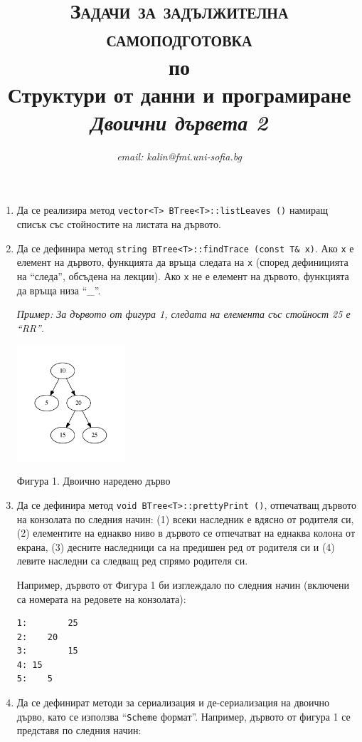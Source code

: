 \documentclass[12pt,a4paper]{article}
\author{\textit{email: kalin@fmi.uni-sofia.bg}}
\title{\textsc{Задачи за задължителна самоподготовка} \\
по \\
Структури от данни и програмиране\\
\textit{Двоични дървета 2}}
\begin{document}
\maketitle


\begin{enumerate}

	\item Да се реализира метод \texttt{vector<T> BTree<T>::listLeaves ()} намиращ списък със стойностите на листата на дървото.

	\item Да се дефинира метод \texttt{string BTree<T>::findTrace (const T\& x)}. Ако \texttt{x} е елемент на дървото, функцията да връща следата на \texttt{x} (според дефиницията на ``следа'', обсъдена на лекции). Ако \texttt{x} не е елемент на дървото, функцията да връща низа ``\_''.

	\textit{Пример: За дървото от фигура 1, следата на елемента със стойност 25 е ``RR''}.

	\begin{flushleft}
	\includegraphics[width=4cm]{images/tree1}

	Фигура 1. Двоично наредено дърво
	\end{flushleft}

	\item Да се дефинира метод \texttt{void BTree<T>::prettyPrint ()}, отпечатващ дървото на конзолата по следния начин: (1) всеки наследник е вдясно от родителя си, (2) елементите на еднакво ниво в дървото се отпечатват на еднаква колона от екрана, (3) десните наследници са на предишен ред от родителя си и (4) левите наследни са следващ ред спрямо родителя си.

	Например, дървото от Фигура 1 би изглеждало по следния начин (включени са номерата на редовете на конзолата):

\begin{verbatim}
1:        25
2:    20	
3:        15
4: 15
5:    5
\end{verbatim}

	\item Да се дефинират методи за сериализация и де-сериализация на двоично дърво, като се използва ``\texttt{Scheme} формат''. Например, дървото от фигура 1 се представя по следния начин:


\end{enumerate}
\end{document}
